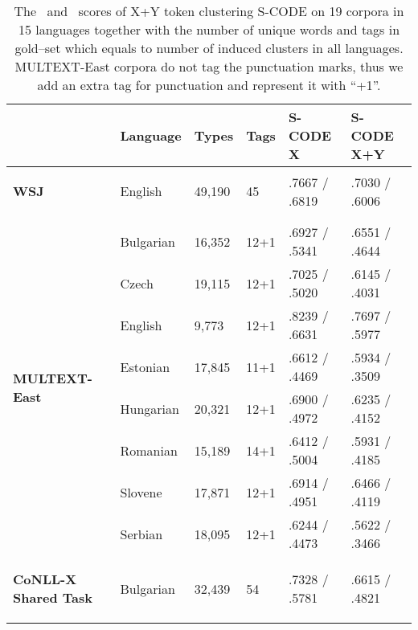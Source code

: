 \begin{table*}[ht]
  \centering
  \caption{The \mto\ and \vm\ scores of X+Y token clustering S-CODE on
    19 corpora in 15 languages together with the number of unique words and
    tags in gold--set which equals to number of induced clusters in
    all languages.  MULTEXT-East corpora do not tag the punctuation
    marks, thus we add an extra tag for punctuation and represent it
    with ``+1''.}
  \begin{tabular}{|l|l|l|l|l|l|}
        \hline
        & Language   & Types    & Tags & S-CODE X & S-CODE X+Y \\ \hline %
        \multirow{1}{*}{\begin{sideways}\textbf{WSJ}\end{sideways}} 
        & English    & 49,190  & 45 & .7667 / .6819 &.7030 / .6006\\
        & & & & &\\ \hline
        \multirow{8}{*}{\begin{sideways}\textbf{MULTEXT-East}\end{sideways}}
        & Bulgarian  & 16,352  & 12+1 & .6927 / .5341 & .6551 / .4644\\
        & Czech      & 19,115  & 12+1 & .7025 / .5020 & .6145 / .4031\\
        & English    & 9,773   & 12+1 & .8239 / .6631 & .7697 / .5977\\
        & Estonian   & 17,845  & 11+1 & .6612 / .4469 & .5934 / .3509\\
        & Hungarian  & 20,321  & 12+1 & .6900 / .4972 & .6235 / .4152\\
        & Romanian   & 15,189  & 14+1 & .6412 / .5004 & .5931 / .4185\\
        & Slovene    & 17,871  & 12+1 & .6914 / .4951 & .6466 / .4119\\
        & Serbian    & 18,095  & 12+1 & .6244 / .4473 & .5622 / .3466\\
        \hline %
        \multirow{10}{*}{\begin{sideways}\textbf{CoNLL-X Shared Task}\end{sideways}}
        & Bulgarian  & 32,439  & 54 & .7328 / .5781 & .6615 / .4821\\

\end{tabular}
\end{table*}
